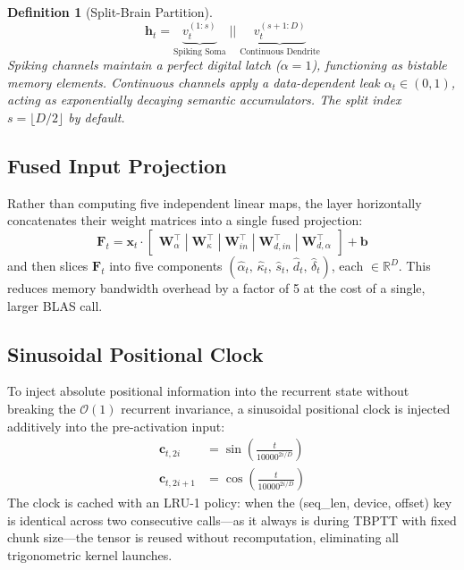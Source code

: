 \documentclass[11pt]{article}
\newtheorem{definition}{Definition}[section]
\begin{document}
\begin{definition}[Split-Brain Partition]
\begin{equation}
    \mathbf{h}_t = \underbrace{v_t^{(1:s)}}_{\text{Spiking Soma}} \;\big|\!\big|\; \underbrace{v_t^{(s+1:D)}}_{\text{Continuous Dendrite}}
\end{equation}
Spiking channels maintain a perfect digital latch ($\alpha = 1$), functioning as bistable memory elements. Continuous channels apply a data-dependent leak $\alpha_t \in (0,1)$, acting as exponentially decaying semantic accumulators. The split index $s = \lfloor D/2 \rfloor$ by default.
\end{definition}

\subsection{Fused Input Projection}

Rather than computing five independent linear maps, the layer horizontally concatenates their weight matrices into a single fused projection:
\begin{equation}
    \mathbf{F}_t = \mathbf{x}_t \cdot \begin{bmatrix} \mathbf{W}_{\alpha}^\top \;|\; \mathbf{W}_{\kappa}^\top \;|\; \mathbf{W}_{in}^\top \;|\; \mathbf{W}_{d,in}^\top \;|\; \mathbf{W}_{d,\alpha}^\top \end{bmatrix} + \mathbf{b}
\end{equation}
and then slices $\mathbf{F}_t$ into five components $(\hat{\alpha}_t,\, \hat{\kappa}_t,\, \hat{s}_t,\, \hat{d}_t,\, \hat{\delta}_t)$, each $\in \mathbb{R}^D$. This reduces memory bandwidth overhead by a factor of 5 at the cost of a single, larger BLAS call.

\subsection{Sinusoidal Positional Clock}

To inject absolute positional information into the recurrent state without breaking the $\mathcal{O}(1)$ recurrent invariance, a sinusoidal positional clock is injected additively into the pre-activation input:
\begin{align}
    \mathbf{c}_{t, 2i} &= \sin\!\left( \frac{t}{10000^{2i/D}} \right) \\
    \mathbf{c}_{t, 2i+1} &= \cos\!\left( \frac{t}{10000^{2i/D}} \right)
\end{align}
The clock is cached with an LRU-1 policy: when the (seq\_len, device, offset) key is identical across two consecutive calls—as it always is during TBPTT with fixed chunk size—the tensor is reused without recomputation, eliminating all trigonometric kernel launches.
\end{document}
